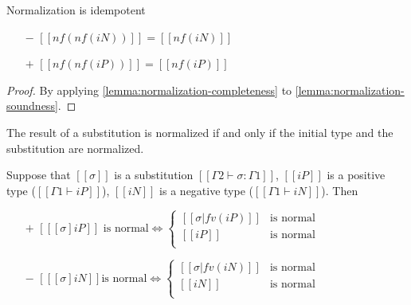 \begin{lemma}
  \label{lemma:norm-idemp}
  Normalization is idempotent
  \begin{itemize}
  \item[$-$] $[[nf(nf(iN))]] = [[nf(iN)]]$
  \item[$+$] $[[nf(nf(iP))]] = [[nf(iP)]]$
  \end{itemize}
\end{lemma}
\begin{proof}
  By applying \cref{lemma:normalization-completeness} to \cref{lemma:normalization-soundness}.
\end{proof}



\begin{lemma}
  \label{lemma:normal-after-subst}
  The result of a substitution is normalized if and only if the initial type and
  the substitution are normalized.

  Suppose that $[[σ]]$ is a substitution  $[[Γ2 ⊢ σ : Γ1]]$,
  $[[iP]]$ is a positive type ($[[Γ1 ⊢ iP]]$),
  $[[iN]]$ is a negative type ($[[Γ1 ⊢ iN]]$). Then
  \begin{itemize}
  \item[$+$]
    $[[ [σ]iP  ]] \text{ is normal} \iff
    \begin{cases}
      [[σ|fv(iP)]] &\text{is normal}\\
      [[iP]]       &\text{is normal}\\
    \end{cases} $
  \item[$-$]
    $[[ [σ]iN  ]] \text{is normal} \iff
    \begin{cases}
      [[σ|fv(iN)]] &\text{is normal}\\
      [[iN]]       &\text{is normal}\\
    \end{cases} $
  \end{itemize}
\end{lemma}

